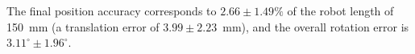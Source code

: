 The final position accuracy corresponds to $2.66 \pm 1.49\%$ of the robot length of 150~mm (a translation error of $3.99 \pm 2.23$~mm), and the overall rotation error is $3.11^\circ \pm 1.96^\circ$.
